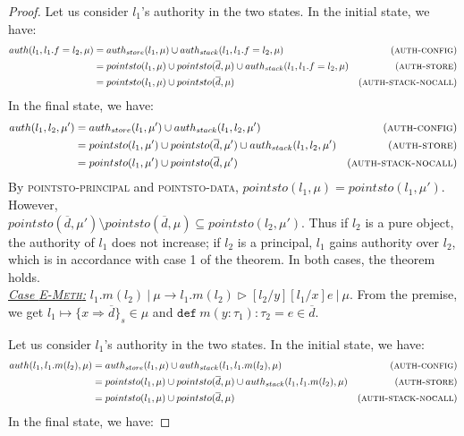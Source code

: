 \documentclass{llncs}
\newcommand{\keywadj}[1]{\mathtt{#1}}
\newcommand{\keyw}[1]{\keywadj{#1}~}
\begin{document}
\begin{proof}
\noindent Let us consider $l_1$'s authority in the two states. In the initial state, we have:
\begin{align*}
auth(l_1, l_1.f = l_2, \mu) &= auth_{store}(l_1, \mu) \cup auth_{stack}(l_1, l_1.f = l_2, \mu) & (\textsc{auth-config})\\
&= pointsto(l_1, \mu) \cup pointsto(\overline{d}, \mu) \cup auth_{stack}(l_1, l_1.f = l_2, \mu) & (\textsc{auth-store})\\
&= pointsto(l_1, \mu) \cup pointsto(\overline{d}, \mu) & (\textsc{auth-stack-nocall})
\end{align*}
In the final state, we have:
\begin{align*}
auth(l_1, l_2, \mu') &= auth_{store}(l_1, \mu') \cup auth_{stack}(l_1, l_2, \mu') & (\textsc{auth-config})\\
&= pointsto(l_1, \mu') \cup pointsto(\overline{d}, \mu') \cup auth_{stack}(l_1, l_2, \mu') & (\textsc{auth-store})\\
&= pointsto(l_1, \mu') \cup pointsto(\overline{d}, \mu') & (\textsc{auth-stack-nocall})
\end{align*}
By \textsc{pointsto-principal} and \textsc{pointsto-data}, $pointsto(l_1, \mu) = pointsto(l_1, \mu')$. However,\\ $pointsto(\overline{d}, \mu') \setminus pointsto(\overline{d}, \mu) \subseteq pointsto(l_2, \mu')$. Thus if $l_2$ is a pure object, the authority of $l_1$ does not increase; if $l_2$ is a principal, $l_1$ gains authority over $l_2$, which is in accordance with case 1 of the theorem. In both cases, the theorem holds.\\

\noindent\underline{\textit{Case \textsc{E-Meth}:}}
$l_1.m(l_2)~|~\mu \rightarrow l_1.m(l_2) \rhd [l_2/y][l_1/x]e~|~\mu$. From the premise, we get $l_1 \mapsto \{ x \Rightarrow \overline{d} \}_{s} \in \mu$ and $\keyw{def} m(y : \tau_1) : \tau_2 = e \in \overline{d}$.

\noindent Let us consider $l_1$'s authority in the two states. In the initial state, we have:
\begin{align*}
auth(l_1, l_1.m(l_2), \mu) &= auth_{store}(l_1, \mu) \cup auth_{stack}(l_1, l_1.m(l_2), \mu) & (\textsc{auth-config})\\
&= pointsto(l_1, \mu) \cup pointsto(\overline{d}, \mu) \cup auth_{stack}(l_1, l_1.m(l_2), \mu) & (\textsc{auth-store})\\
&= pointsto(l_1, \mu) \cup pointsto(\overline{d}, \mu) & (\textsc{auth-stack-nocall})
\end{align*}
In the final state, we have:


\end{proof}
\end{document}
